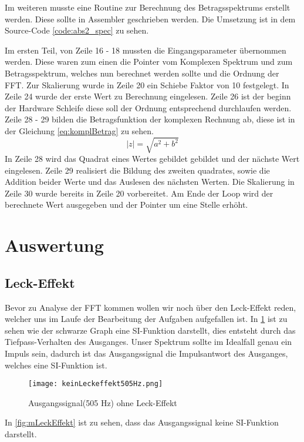Im weiteren musste eine Routine zur Berechnung des Betragsspektrums erstellt werden. Diese sollte in Assembler geschrieben werden. Die Umsetzung ist in dem Source-Code \autoref{code:abs2_spec} zu sehen.
\label{code:abs2_spec}

Im ersten Teil, von Zeile 16 - 18 mussten die Eingangsparameter übernommen werden. Diese waren zum einen  die Pointer vom Komplexen Spektrum und zum Betragsspektrum, welches nun berechnet werden sollte und die Ordnung der FFT.
Zur Skalierung wurde in Zeile 20 ein Schiebe Faktor von 10 festgelegt.
In Zeile 24 wurde der erste Wert zu Berechnung eingelesen. Zeile 26 ist der beginn der Hardware Schleife diese soll der Ordnung entsprechend durchlaufen werden. Zeile 28 - 29 bilden die Betragsfunktion der komplexen Rechnung ab, diese ist in der Gleichung \ref{eq:komplBetrag} zu sehen.
\begin{equation}
\label{eq:komplBetrag}
	\mid z \mid = \sqrt{a^2 + b^2}
\end{equation} 
In Zeile 28 wird das Quadrat eines Wertes gebildet gebildet und der nächste Wert eingelesen. 
Zeile 29 realisiert die Bildung des zweiten quadrates, sowie die Addition beider Werte und das Auslesen des nächsten Werten. Die Skalierung in Zeile 30 wurde bereits in Zeile 20 vorbereitet.
Am Ende der Loop wird der berechnete Wert ausgegeben und der Pointer um eine Stelle erhöht. 
\section{Auswertung}\label{AFFToF}
\subsection*{Leck-Effekt}
Bevor zu Analyse der FFT kommen wollen wir noch über den Leck-Effekt reden, welcher uns im Laufe der Bearbeitung der Aufgaben aufgefallen ist. In \cref{fig:oLeckEffekt} ist zu sehen wie der schwarze Graph eine SI-Funktion darstellt, dies entsteht durch das Tiefpass-Verhalten des Ausganges. Unser Spektrum sollte im Idealfall genau ein Impuls sein, dadurch ist das Ausgangssignal die Impulsantwort des Ausganges, welches eine SI-Funktion ist. 
\begin{figure}[H]
	\texttt{[image: keinLeckeffekt505Hz.png]}
  \caption{Ausgangssignal(505 Hz) ohne Leck-Effekt}
  \label{fig:oLeckEffekt}
\end{figure}
In \cref{fig:mLeckEffekt} ist zu sehen, dass das Ausgangssignal keine SI-Funktion darstellt.

